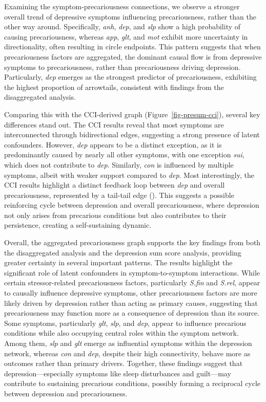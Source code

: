 \documentclass[
]{article}
\begin{document}
Examining the symptom-precariousness connections, we observe a stronger
overall trend of depressive symptoms influencing precariousness, rather
than the other way around. Specifically, \emph{anh}, \emph{dep}, and
\emph{slp} show a high probability of causing precariousness, whereas
\emph{app}, \emph{glt}, and \emph{mot} exhibit more uncertainty in
directionality, often resulting in circle endpoints. This pattern
suggests that when precariousness factors are aggregated, the dominant
causal flow is from depressive symptoms to precariousness, rather than
precariousness driving depression. Particularly, \emph{dep} emerges as
the strongest predictor of precariousness, exhibiting the highest
proportion of arrowtails, consistent with findings from the
disaggregated analysis.

Comparing this with the CCI-derived graph (Figure~\ref{fig-presum-cci}),
several key differences stand out. The CCI results reveal that most
symptoms are interconnected through bidirectional edges, suggesting a
strong presence of latent confounders. However, \emph{dep} appears to be
a distinct exception, as it is predominantly caused by nearly all other
symptoms, with one exception \emph{sui}, which does not contribute to
\emph{dep}. Similarly, \emph{con} is influenced by multiple symptoms,
albeit with weaker support compared to \emph{dep}. Most interestingly,
the CCI results highlight a distinct feedback loop between \emph{dep}
and overall precariousness, represented by a tail-tail edge
(\textemdash ). This suggests a possible reinforcing cycle between
depression and overall precariousness, where depression not only arises
from precarious conditions but also contributes to their persistence,
creating a self-sustaining dynamic.

Overall, the aggregated precariousness graph supports the key findings
from both the disaggregated analysis and the depression sum score
analysis, providing greater certainty in several important patterns. The
results highlight the significant role of latent confounders in
symptom-to-symptom interactions. While certain stressor-related
precariousness factors, particularly \emph{S.fin} and \emph{S.rel},
appear to causally influence depressive symptoms, other precariousness
factors are more likely driven by depression rather than acting as
primary causes, suggesting that precariousness may function more as a
consequence of depression than its source. Some symptoms, particularly
\emph{glt}, \emph{slp}, and \emph{dep}, appear to influence precarious
conditions while also occupying central roles within the symptom
network. Among them, \emph{slp} and \emph{glt} emerge as influential
symptoms within the depression network, whereas \emph{con} and
\emph{dep}, despite their high connectivity, behave more as outcomes
rather than primary drivers. Together, these findings suggest that
depression---especially symptoms like sleep disturbances and guilt---may
contribute to sustaining precarious conditions, possibly forming a
reciprocal cycle between depression and precariousness.
\end{document}
